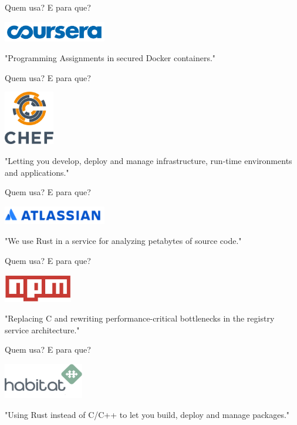 \documentclass[aspectratio=169]{beamer}
\begin{document}
\begin{frame}{Quem usa? E para que?}
	\begin{center}
		\includegraphics[width=4.5cm]{imgs/coursera.png}	
		
		"Programming Assignments in secured Docker containers."
	\end{center}
\end{frame}

\begin{frame}{Quem usa? E para que?}
	\begin{center}
		\includegraphics[width=2.2cm]{imgs/chef.png}	
		
		"Letting you develop, deploy and manage infrastructure, run-time environments and applications."
	\end{center}
\end{frame}

\begin{frame}{Quem usa? E para que?}
	\begin{center}
		\includegraphics[width=4.5cm]{imgs/atlassian.png}	
		
		"We use Rust in a service for analyzing petabytes of source code."
	\end{center}
\end{frame}

\begin{frame}{Quem usa? E para que?}
	\begin{center}
		\includegraphics[width=3.0cm]{imgs/npm.jpeg}	
		
		"Replacing C and rewriting performance-critical bottlenecks in the registry service architecture."
	\end{center}
\end{frame}

\begin{frame}{Quem usa? E para que?}
	\begin{center}
		\includegraphics[width=3.5cm]{imgs/habitat.png}	
		
		"Using Rust instead of C/C++ to let you build, deploy and manage packages."
	\end{center}
\end{frame}
\end{document}
